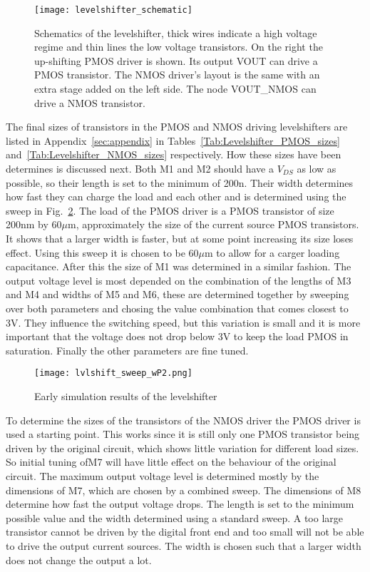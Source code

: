 \begin{figure}[h]
 \texttt{[image: levelshifter\_schematic]}
 \caption{Schematics of the levelshifter, thick wires indicate a high voltage regime and thin lines the low voltage transistors. On the right the up-shifting PMOS driver is shown. Its output VOUT can drive a PMOS transistor. The NMOS driver's layout is the same with an extra stage added on the left side. The node VOUT\_NMOS can drive a NMOS transistor.}
 \label{fig:schematic_levelshifter}
\end{figure}
The final sizes of transistors in the PMOS and NMOS driving levelshifters are listed in Appendix~\ref{sec:appendix} in Tables~\ref{Tab:Levelshifter_PMOS_sizes} and~\ref{Tab:Levelshifter_NMOS_sizes} respectively. How these sizes have been determines is discussed next. Both M1 and M2 should have a $V_{DS}$ as low as possible, so their length is set to the minimum of 200n. Their width determines how fast they can charge the load and each other and is determined using the sweep in Fig.~\ref{fig:levelshifter_sweep}. The load of the PMOS driver is a PMOS transistor of size 200nm by 60$\mu$m, approximately the size of the current source PMOS transistors. It shows that a larger width is faster, but at some point increasing its size loses effect. Using this sweep it is chosen to be 60$\mu$m to allow for a carger loading capacitance. After this the size of M1 was determined in a similar fashion. The output voltage level is most depended on the combination of the lengths of M3 and M4 and widths of M5 and M6, these are determined together by sweeping over both parameters and chosing the value combination that comes closest to 3V. They influence the switching speed, but this variation is small and it is more important that the voltage does not drop below 3V to keep the load PMOS in saturation. Finally the other parameters are fine tuned.
\begin{figure}[h]
 \texttt{[image: lvlshift\_sweep\_wP2.png]}
 \caption{Early simulation results of the levelshifter}
 \label{fig:levelshifter_sweep}
\end{figure}
To determine the sizes of the transistors of the NMOS driver the PMOS driver is used a starting point. This works since it is still only one PMOS transistor being driven by the original circuit, which shows little variation for different load sizes. So initial tuning ofM7 will have little effect on the behaviour of the original circuit. The maximum output voltage level is determined mostly by the dimensions of M7, which are chosen by a combined sweep. The dimensions of M8 determine how fast the output voltage drops. The length is set to the minimum possible value and the width determined using a standard sweep. A too large transistor cannot be driven by the digital front end and too small will not be able to drive the output current sources. The width is chosen such that a larger width does not change the output a lot.

